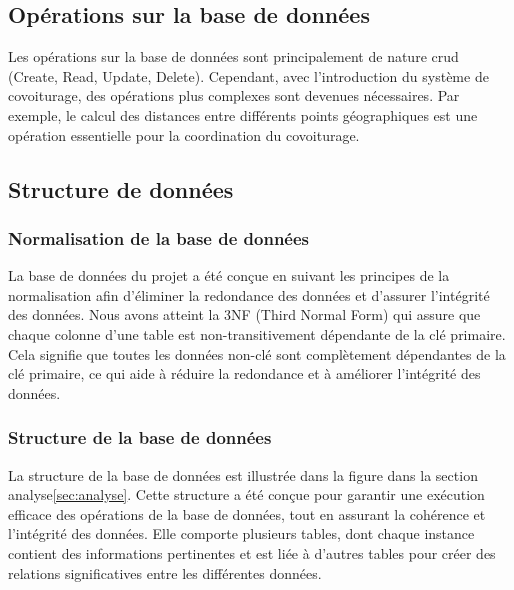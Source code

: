 \subsection{Opérations sur la base de données}\label{subsec:operation-sur-la-base-de-donnees}
Les opérations sur la base de données sont principalement de nature \Gls{crud} (Create, Read, Update, Delete).
Cependant, avec l'introduction du système de covoiturage, des opérations plus complexes sont devenues nécessaires.
Par exemple, le calcul des distances entre différents points géographiques est une opération essentielle pour la coordination du covoiturage.\\

\subsection{Structure de données}\label{subsec:structure-de-donnees}

\subsubsection{Normalisation de la base de données}\label{subsubsec:normalisation}
La base de données du projet a été conçue en suivant les principes de la normalisation afin d'éliminer la redondance des données et d'assurer l'intégrité des données.
Nous avons atteint la 3NF (Third Normal Form) qui assure que chaque colonne d'une table est non-transitivement dépendante de la clé primaire.
Cela signifie que toutes les données non-clé sont complètement dépendantes de la clé primaire, ce qui aide à réduire la redondance et à améliorer l'intégrité des données.\\

\subsubsection{Structure de la base de données}
La structure de la base de données est illustrée dans la figure dans la section analyse\ref{sec:analyse}.
Cette structure a été conçue pour garantir une exécution efficace des opérations de la base de données, tout en assurant la cohérence et l'intégrité des données.
Elle comporte plusieurs tables, dont chaque instance contient des informations pertinentes et est liée à d'autres tables pour créer des relations significatives entre les différentes données.\\


